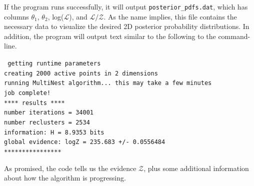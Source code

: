 \documentclass{article}
\begin{document}
If the program runs successfully, it will output {\tt posterior\_pdfs.dat}, which has columns  $\theta_1$, $\theta_2$, log($\mathcal{L}$), and $\mathcal{L/Z}$. As the name implies, this file contains the necessary data to visualize the desired 2D posterior probability distributions. In addition, the program will output text similar to the following to the command-line. 

\begin{adjustwidth*}{1.2cm}{1.2cm}
{\tt
getting runtime parameters\\
creating 2000 active points in 2 dimensions\\
running MultiNest algorithm... this may take a few minutes\\
job complete!\\
**** results ****\\
number iterations = 34001\\
number reclusters = 2534\\
information: H =  8.9353 bits\\
global evidence: logZ = 235.683 +/- 0.0556484\\
****************}
\end{adjustwidth*}

As promised, the code tells us the evidence $\mathcal{Z}$, plus some additional information about how the algorithm is progressing. 



\end{document}
